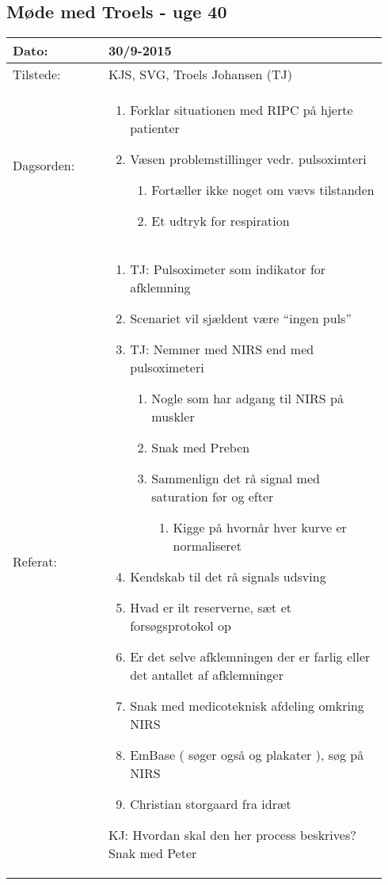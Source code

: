 	\subsection{Møde med Troels - uge 40} \label{app:troelsuge40}
	\begin{longtable}{|p{0.24\linewidth}|p{0.7\linewidth}|}
		\hline
		Dato: & 30/9-2015\\ \hline
		Tilstede: & KJS, SVG, Troels Johansen (TJ) \\ \hline
		Dagsorden: &
		\begin{enumerate}
			\item Forklar situationen med RIPC på hjerte patienter
			\item Væsen problemstillinger vedr. pulsoximteri
			\begin{enumerate}
				\item Fortæller ikke noget om vævs tilstanden
				\item Et udtryk for respiration 
			\end{enumerate}
		\end{enumerate}
		\\ \hline
		Referat: & 
		\begin{enumerate}
			\item TJ: Pulsoximeter som indikator for afklemning
			\item Scenariet vil sjældent være “ingen puls” 
			\item TJ: Nemmer med NIRS end med pulsoximeteri 
			\begin{enumerate}
				\item Nogle som har adgang til NIRS på muskler
				\item Snak med Preben
				\item Sammenlign det rå signal med saturation før og efter
				\begin{enumerate}
					\item Kigge på hvornår hver kurve er normaliseret 
				\end{enumerate}
			\end{enumerate}
			\item Kendskab til det rå signals udsving
			\item Hvad er ilt reserverne, sæt et forsøgsprotokol op
			\item Er det selve afklemningen der er farlig eller det antallet af afklemninger 
			\item Snak med medicoteknisk afdeling omkring NIRS 
			\item EmBase ( søger også og plakater ), søg på NIRS 
			\item Christian storgaard fra idræt
		\end{enumerate}
		KJ: Hvordan skal den her process beskrives? Snak med Peter 
		\\ \hline
	\end{longtable}
	

